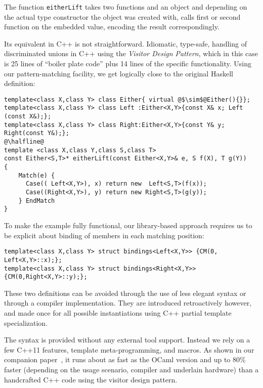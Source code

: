 \documentclass{llncs}
\DeclareRobustCommand{\codehaskell}[1]{{\lstinline[breaklines=false,language=Haskell]{#1}}}
\begin{document}
\noindent
The function \codehaskell{eitherLift} takes two functions and an 
object and depending on the actual type constructor the object was created with, 
calls first or second function on the embedded value, encoding the result 
correspondingly.

Its equivalent in C++ is not straightforward. Idiomatic, type-safe, handling of 
discriminated unions in C++ using the \emph{Visitor Design Pattern}\cite{DesignPatterns}, 
which in this case is 25 lines of ``boiler plate code'' plus 14 lines 
of the specific functionality. Using our 
pattern-matching facility, we get logically close to the original Haskell definition:

\begin{lstlisting}[keepspaces,columns=flexible]
template<class X,class Y> class Either{ virtual @$\sim$@Either(){}};
template<class X,class Y> class Left :Either<X,Y>{const X& x; Left (const X&);};
template<class X,class Y> class Right:Either<X,Y>{const Y& y; Right(const Y&);};
@\halfline@
template <class X,class Y,class S,class T>
const Either<S,T>* eitherLift(const Either<X,Y>& e, S f(X), T g(Y))
{
    Match(e) {
      Case(( Left<X,Y>), x) return new  Left<S,T>(f(x));
      Case((Right<X,Y>), y) return new Right<S,T>(g(y));
    } EndMatch
}
\end{lstlisting}

\noindent
To make the example fully functional, our library-based approach requires us to 
be explicit about binding of members in each matching position:

\begin{lstlisting}[keepspaces,columns=flexible]
template<class X,class Y> struct bindings<Left<X,Y>> {CM(0, Left<X,Y>::x);};
template<class X,class Y> struct bindings<Right<X,Y>>{CM(0,Right<X,Y>::y);};
\end{lstlisting}

\noindent
These two definitions can be avoided through the use of less elegant syntax
or through a compiler implementation.
They are introduced retroactively however, and made once for all 
possible instantiations using C++ partial template specialization. 

The syntax is provided without any external tool support. Instead we rely on a 
few C++11 features\cite{C++11}, template meta-programming, and macros. As shown 
in our companion paper~\cite{TypeSwitch}, it runs about as fast as the OCaml 
version and up to 80\% faster (depending on the usage scenario, compiler and 
underlain hardware) than a handcrafted C++ code using the visitor 
design pattern.
\end{document}
